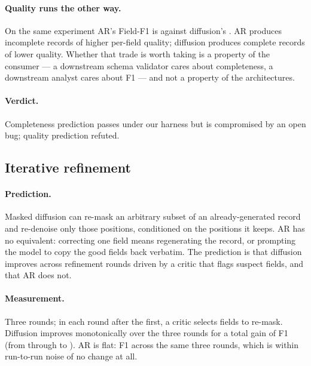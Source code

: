\paragraph{Quality runs the other way.} On the same experiment AR's Field-F1 is
\arDeadlineFOne{} against diffusion's \dmDeadlineFOne{}. AR produces incomplete
records of higher per-field quality; diffusion produces complete records of
lower quality. Whether that trade is worth taking is a property of the consumer
--- a downstream schema validator cares about completeness, a downstream
analyst cares about F1 --- and not a property of the architectures.

\paragraph{Verdict.} Completeness prediction passes under our harness but is
compromised by an open bug; quality prediction refuted.

\subsection{Iterative refinement}
\label{sec:app-refine}

\paragraph{Prediction.} Masked diffusion can re-mask an arbitrary subset of an
already-generated record and re-denoise only those positions, conditioned on the
positions it keeps. AR has no equivalent: correcting one field means
regenerating the record, or prompting the model to copy the good fields back
verbatim. The prediction is that diffusion improves across refinement rounds
driven by a critic that flags suspect fields, and that AR does not.

\paragraph{Measurement.} Three rounds; in each round after the first, a critic
selects fields to re-mask. Diffusion improves monotonically over the three
rounds for a total gain of  F1 (from
 through  to
). AR is flat:  F1 across the same three rounds,
which is within run-to-run noise of no change at all.

